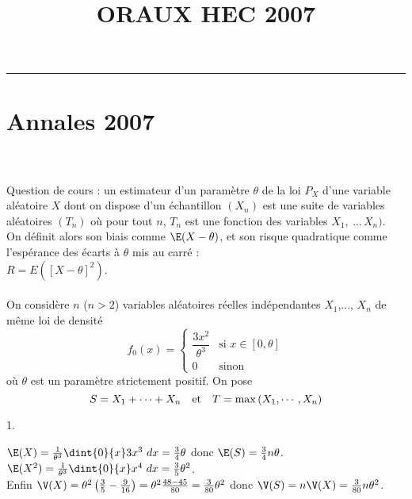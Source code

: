\documentclass[11pt]{article}%
\title{\bf \vspace{-1cm} ORAUX HEC 2007} %
\author{} %
\date{} %
\begin{document}
\maketitle %
\vspace{-1.2cm}\hrule %
\thispagestyle{fancy}

\vspace*{.4cm}


\section{Annales 2007}


 \begin{exercice} \indent \\
\\
 Question de cours : un estimateur d'un paramètre $\theta$ de la loi
$P_{X}$ d'une variable aléatoire $X$ dont on dispose d'un échantillon
$(X_{n})$ est une suite de variables aléatoires $(T_{n})$ où pour tout
$n$, $T_{n}$ est une fonction des variables $X_{1},\ \dots\, X_{n})$.
\\
 On définit alors son biais comme $\E(X - \theta)$, et son risque
quadratique comme l'espérance des écarts à $\theta$ mis au carré : \\
$R = E ( [X - \theta]^{2})$. \\
\\
 On considère $n$ ($n>2$) variables aléatoires réelles indépendantes
 $X_{1}$,..., $X_{n}$ de même loi de densité 
\[
 f_{0}\left( x\right) = \left\{  
\begin{array}{cc}
 \dfrac{3x^{2}}{\theta ^{3}} & \text{si }x\in \left[ 0,\theta \right]
\\
 0 & \text{sinon}
\end{array}
\right. 
\]
 où $\theta $ est un paramètre strictement positif. On pose 
\[
 S = X_{1} + \cdots + X_{n}\text{\quad et\quad }T = \max \left(
X_{1},\cdots,X_{n}\right)
\]

 \begin{noliste}{1.}
 \setlength{\itemsep}{4mm}
 \item $\E(X) = \frac{1}{\theta^{3}} \dint{0}{x} 3 x^{3}\ dx =
\frac{3}{4} \theta$ donc $\E(S) = \frac{3}{4} n \theta$. \\
 $\E(X^{2}) = \frac{1}{\theta^{3}} \dint{0}{x} x^{4}\ dx = \frac{3}{5}
\theta^{2}$. \\
 Enfin $\V(X) = \theta^{2} \left( \frac{3}{5} - \frac{9}{16} \right) =
\theta^{2} \frac{48 - 45}{80} = \frac{3}{80} \theta^{2}$ donc $\V(S) =
n \V(X) = \frac{3}{80} n \theta^{2}$. \\


\end{noliste}
\end{exercice}
\end{document}
